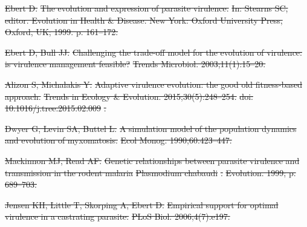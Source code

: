 \documentclass[10pt,letterpaper]{article}
\providecommand{\DIFdeltex}[1]{{\protect\color{red}\sout{#1}}}                      %
\providecommand{\DIFaddbegin}{} %
\providecommand{\DIFaddend}{} %
\providecommand{\DIFdelbegin}{} %
\providecommand{\DIFdel}[1]{\texorpdfstring{\DIFdeltex{#1}}{}} %
\newcommand{\DIFscaledelfig}{0.5}
\newlength{\DIFdelgraphicswidth} %
\newlength{\DIFdelgraphicsheight} %
\newcommand{\DIFaddincludegraphics}[2][]{{\color{blue}\fbox{\DIFOincludegraphics[#1]{#2}}}} %
\newcommand{\DIFdelincludegraphics}[2][]{%
\sbox{\DIFdelgraphicsbox}{\DIFOincludegraphics[#1]{#2}}%
\settoboxwidth{\DIFdelgraphicswidth}{\DIFdelgraphicsbox} %
\settoboxtotalheight{\DIFdelgraphicsheight}{\DIFdelgraphicsbox} %
\scalebox{\DIFscaledelfig}{%
\parbox[b]{\DIFdelgraphicswidth}{\usebox{\DIFdelgraphicsbox}\\[-\baselineskip] \rule{\DIFdelgraphicswidth}{0em}}\llap{\resizebox{\DIFdelgraphicswidth}{\DIFdelgraphicsheight}{%
\setlength{\unitlength}{\DIFdelgraphicswidth}%
\begin{picture}(1,1)%
\thicklines\linethickness{2pt} %
{\color[rgb]{1,0,0}\put(0,0){\framebox(1,1){}}}%
{\color[rgb]{1,0,0}\put(0,0){\line( 1,1){1}}}%
{\color[rgb]{1,0,0}\put(0,1){\line(1,-1){1}}}%
\end{picture}%
}\hspace*{3pt}}} %
} %
\DeclareRobustCommand{\DIFaddbegin}{\DIFOaddbegin \let\includegraphics\DIFaddincludegraphics} %
\DeclareRobustCommand{\DIFaddend}{\DIFOaddend \let\includegraphics\DIFOincludegraphics} %
\DeclareRobustCommand{\DIFdelbegin}{\DIFOdelbegin \let\includegraphics\DIFdelincludegraphics} %
\begin{document}
\DIFaddbegin \clearpage

\DIFaddend \nolinenumbers

%
%
% 

\DIFdelbegin %

\DIFdel{Ebert D.
}%
\DIFdel{The evolution and expression of parasite virulence.
}%
\DIFdel{In: Stearns SC, editor. Evolution in Health \& Disease. New York:
  Oxford University Press, Oxford, UK; 1999. p. 161--172.
}%

\DIFdel{Ebert D, Bull JJ.
}%
\DIFdel{Challenging the trade-off model for the evolution of virulence: is
  virulence management feasible?
}%
\DIFdel{Trends Microbiol. 2003;11(1):15--20.
}%

\DIFdel{Alizon S, Michalakis Y.
}%
\DIFdel{Adaptive virulence evolution: the good old fitness-based approach.
}%
\DIFdel{Trends in Ecology \& Evolution. 2015;30(5):248--254.
}%
\DIFdel{doi:}%
\DIFdel{10.1016/j.tree.2015.02.009}%
\DIFdel{.
}%

\DIFdel{Dwyer G, Levin SA, Buttel L.
}%
\DIFdel{A simulation model of the population dynamics and evolution of
  myxomatosis.
}%
\DIFdel{Ecol Monog. 1990;60:423--447.
}%

\DIFdel{Mackinnon MJ, Read AF.
}%
\DIFdel{Genetic relationships between parasite virulence and transmission in
  the rodent malaria }%
\DIFdel{Plasmodium chabaudi}%
\DIFdel{.
}%
\DIFdel{Evolution. 1999; p. 689--703.
}%

\DIFdel{Jensen KH, Little T, Skorping A, Ebert D.
}%
\DIFdel{Empirical support for optimal virulence in a castrating parasite.
}%
\DIFdel{PLoS Biol. 2006;4(7):e197.
}%
\end{document}
